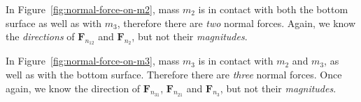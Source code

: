 In Figure~\ref{fig:normal-force-on-m2}, mass $m_2$ is in contact with both the
bottom surface as well as with $m_3$, therefore there are \emph{two} normal
forces. Again, we know the \emph{directions} of $\bm F_{n_{12}}$ and
$\bm F_{n_2}$, but not their \emph{magnitudes}.

In Figure~\ref{fig:normal-force-on-m3}, mass $m_3$ is in contact with $m_2$ and
$m_3$, as well as with the bottom surface. Therefore there are \emph{three}
normal forces. Once again, we know the direction of  $\bm F_{n_{31}}$,
$\bm F_{n_{21}}$ and $\bm F_{n_3}$, but not their \emph{magnitudes}.



